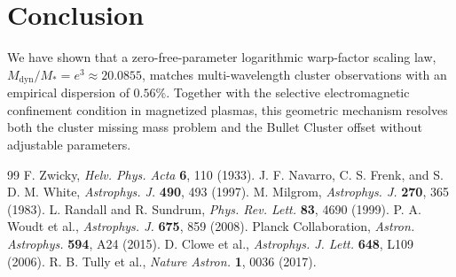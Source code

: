 \documentclass[10pt,twocolumn]{article}
\begin{document}
\section{Conclusion}

We have shown that a zero-free-parameter logarithmic warp-factor scaling law, $M_{\text{dyn}}/M_* = e^3 \approx 20.0855$, matches multi-wavelength cluster observations with an empirical dispersion of $0.56\%$. Together with the selective electromagnetic confinement condition in magnetized plasmas, this geometric mechanism resolves both the cluster missing mass problem and the Bullet Cluster offset without adjustable parameters.

\begin{thebibliography}{99}
 F. Zwicky, \textit{Helv. Phys. Acta} \textbf{6}, 110 (1933).
 J. F. Navarro, C. S. Frenk, and S. D. M. White, \textit{Astrophys. J.} \textbf{490}, 493 (1997).
 M. Milgrom, \textit{Astrophys. J.} \textbf{270}, 365 (1983).
 L. Randall and R. Sundrum, \textit{Phys. Rev. Lett.} \textbf{83}, 4690 (1999).
 P. A. Woudt et al., \textit{Astrophys. J.} \textbf{675}, 859 (2008).
 Planck Collaboration, \textit{Astron. Astrophys.} \textbf{594}, A24 (2015).
 D. Clowe et al., \textit{Astrophys. J. Lett.} \textbf{648}, L109 (2006).
 R. B. Tully et al., \textit{Nature Astron.} \textbf{1}, 0036 (2017).
\end{thebibliography}
\end{document}
